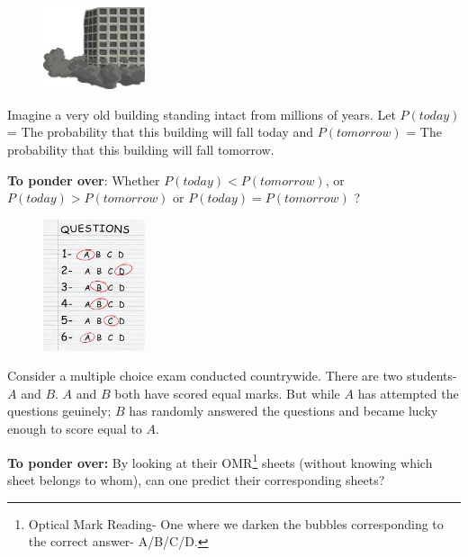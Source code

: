 \documentclass{article}
\begin{document}
\begin{tcolorbox}
\begin{figure}
\begin{flushleft}
\includegraphics[width=3cm]{building.jpeg}
\end{flushleft}
\end{figure} 
Imagine a very old building standing intact from millions of years. Let $P(today)$ = The probability that this building will fall today and $P(tomorrow)$ = The probability that this building will fall tomorrow. 

\textbf{To ponder over}: Whether $P(today)<P(tomorrow)$, or $P(today)>P(tomorrow)$ or $P(today)=P(tomorrow)$ ?

\end{tcolorbox}

\begin{tcolorbox}
\begin{figure}
\begin{flushleft}
\includegraphics[width=3cm]{omr.jpeg}
\end{flushleft}
\end{figure} 
Consider a multiple choice exam conducted countrywide. There are two students- $A$ and $B$. $A$ and $B$ both have scored equal marks. But while $A$ has attempted the questions geuinely; $B$ has randomly answered the questions and became lucky enough to score equal to $A$. 

\textbf{To ponder over:} By looking at their OMR\footnote{Optical Mark Reading- One where we darken the bubbles corresponding to the correct answer- A/B/C/D.} sheets (without knowing which sheet belongs to whom), can one predict their corresponding sheets?


\end{tcolorbox}
\end{document}
